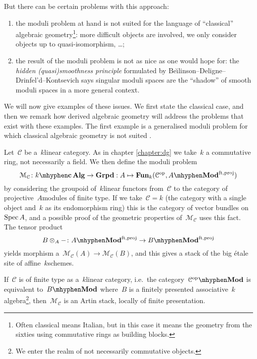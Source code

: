 \begin{refsection}
But there can be certain problems with this approach:
\begin{enumerate}
  \item the moduli problem at hand is not suited for the language of ``classical'' algebraic geometry\footnote{Often classical means Italian, but in this case it means the geometry from the sixties using commutative rings as building blocks.}: more difficult objects are involved, we only consider objects up to quasi-isomorphism, \dots;
  \item the result of the moduli problem is not as nice as one would hope for: the \emph{hidden (quasi)smoothness principle} formulated by Be\u\i linson--Deligne--Drinfel'd--Kontsevich says singular moduli spaces are the ``shadow'' of smooth moduli spaces in a more general context.
\end{enumerate}
We will now give examples of these issues. We first state the classical case, and then we remark how derived algebraic geometry will address the problems that exist with these examples. The first example is a generalised moduli problem for which classical algebraic geometry is not suited \cite[section 1]{toen-vaquie}.
\begin{example}
  Let~$\mathcal{C}$ be a~$k$\dash linear category. As in chapter \ref{chapter:dg} we take~$k$ a commutative ring, not necessarily a field. We then define the moduli problem
  \begin{equation}
    \mathcal{M}_{\mathcal{C}}\colon k\mhyphen\mathbf{c\,Alg}\to\mathbf{Grpd}:A\mapsto\Fun_k(\mathcal{C}^\opp,A\mhyphen\Mod^{\mathrm{ft,proj}})
  \end{equation}
  by considering the groupoid of~$k$\dash linear functors from~$\mathcal{C}$ to the category of projective~$A$\dash modules of finite type. If we take~$\mathcal{C}=k$ (the category with a single object and~$k$ as its endomorphism ring) this is the category of vector bundles on~$\operatorname{Spec} A$, and a possible proof of the geometric properties of~$\mathcal{M}_{\mathcal{C}}$ uses this fact. The tensor product
  \begin{equation}
    B\otimes_A-\colon A\mhyphen\Mod^{\mathrm{ft,proj}}\to B\mhyphen\Mod^{\mathrm{ft,proj}}
  \end{equation}
  yields morphism a~$\mathcal{M}_{\mathcal{C}}(A)\to\mathcal{M}_{\mathcal{C}}(B)$, and this gives a stack of the big \'etale site of affine~$k$\dash schemes.

  If~$\mathcal{C}$ is of finite type as a~$k$\dash linear category, i.e.\ the category~$\mathcal{C}^\opp\mhyphen\Mod$ is equivalent to~$B\mhyphen\Mod$ where~$B$ is a finitely presented associative~$k$\dash algebra\footnote{We enter the realm of not necessarily commutative objects.}, then~$\mathcal{M}_{\mathcal{C}}$ is an Artin stack, locally of finite presentation.


\end{example}
\end{refsection}
